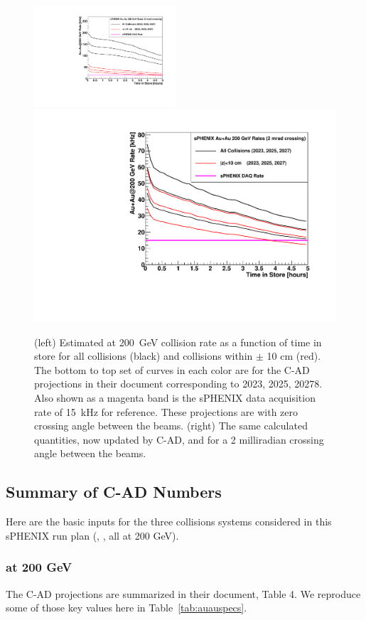 \begin{figure}
\centering
\includegraphics[width=0.47\textwidth]{figs/figure_auauratestore_0mrad.pdf}
\includegraphics[width=0.47\linewidth]{figs/figure_auauratestore_2mrad.pdf}
\caption{(left) Estimated \auau at 200~GeV collision rate as a function of time in store for all collisions (black) and collisions within $\pm$ 10 cm (red).   The bottom to top set of curves in each color are for the C-AD projections in their document corresponding to 2023, 2025, 20278.
Also shown as a magenta band is the sPHENIX data acquisition rate of 15~kHz for reference.
These projections are with zero crossing angle between the beams. 
(right)
The same calculated quantities, now updated by C-AD, and for a 2 milliradian crossing angle between the beams.
\label{fig:auaulumcurves}}
\end{figure}



\subsection{Summary of C-AD Numbers}

Here are the basic inputs for the three collisions systems considered in this sPHENIX run plan (\pp, \pau, \auau all at 200 GeV).

\subsubsection{\auau at 200 GeV}

The C-AD projections are summarized in their document, Table 4.   We 
reproduce some of those key values here in Table~\ref{tab:auauspecs}.  

